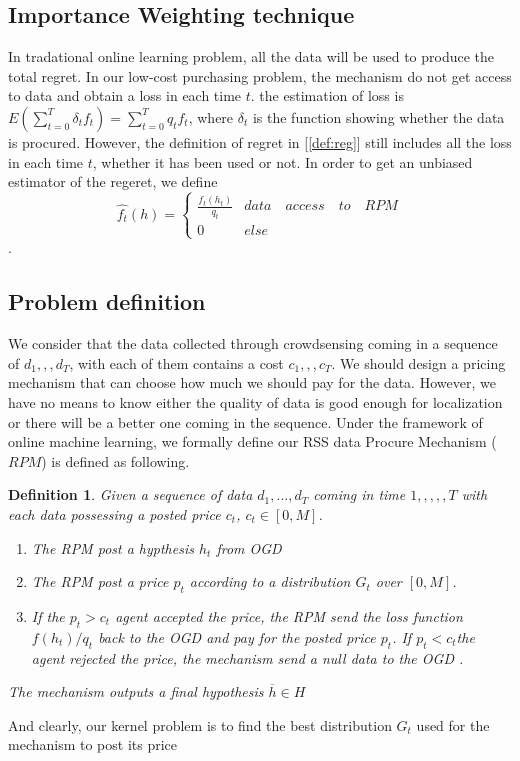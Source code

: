 \documentclass[10pt,conference,compsocconf,letterpaper]{IEEEtran}
\newtheorem{definition}{Definition}
\begin{document}
\subsection{Importance Weighting technique}

In tradational online learning problem, all the data will be used to produce the total regret. In our low-cost purchasing problem, the mechanism do not get access to data and obtain a loss in each time $t$.  the estimation of loss is $E(\sum_{t=0}^T\delta_t f_t)=\sum_{t=0}^T q_t f_t$, where $\delta_t$ is the function showing whether the data is procured. However, the definition of regret in [\ref{def:reg}] still includes all the loss in each time $t$, whether it has been used or not.  In order to get an unbiased estimator of the regeret, we define
\begin{equation}
\hat{f_t}(h)=\begin{cases}{}
  \frac{f_t(h_t)}{q_t} & data\quad access\quad to\quad RPM  \\
  0 & else 
\end{cases}
\end{equation}
.


\subsection{Problem definition}
We consider that the data collected through crowdsensing coming in a sequence of $d_1,,,d_T$, with each of them contains a cost $c_1,,,c_T$. We should design a pricing mechanism that can choose how much we should pay for the data. However, we have no means to know either the quality of data is good enough for localization or there will be a better one coming in the sequence. Under the framework of online machine learning, we formally define our RSS data Procure Mechanism ($RPM$) is defined as following.
\begin{definition}{}\label{def:1}
Given a sequence of data ${d_1,...,d_T}$ coming in time $1,,,,,T$ with each data possessing a posted price $c_t$, $c_t\in [0,M]$. 
\begin{enumerate}
\item The RPM post a hypthesis $h_t$ from OGD
\item The RPM post a price $p_t$ according to a distribution $G_t$ over $[0,M]$.
\item If the $p_t>c_t$ agent accepted the price, the RPM send the loss function $f(h_t)/q_t$ back to the OGD and pay for the posted price $p_t$. If $p_t<c_t$the agent rejected the price, the mechanism send a null data to the OGD . 
\end{enumerate}
The mechanism outputs a final hypothesis $\overline{h}\in H$
\end{definition}
And clearly, our kernel problem is to find the best distribution $G_t$ used for the mechanism to post its price 
\end{document}
